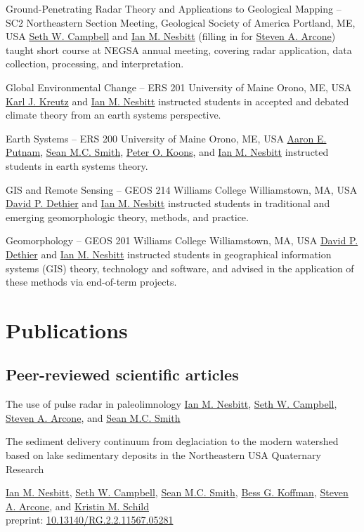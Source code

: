\documentclass[a4paper,12pt,sans,colorlinks]{moderncv}
\newcommand{\me}{\href{https://www.iannesbitt.org}{Ian M. Nesbitt}}
\newcommand{\seth}{\href{https://www.alpinesciences.net}{Seth W. Campbell}}
\newcommand{\sean}{\href{https://umaine.edu/earthclimate/people/sean-m-c-smith/}{Sean M.C. Smith}}
\newcommand{\bess}{\href{https://www.colby.edu/directory/profile/bess.koffman/}{Bess G. Koffman}}
\newcommand{\stevearcone}{\href{https://engineering.dartmouth.edu/community/faculty/steven-arcone}{Steven A. Arcone}}
\newcommand{\kristin}{\href{https://climatechange.umaine.edu/people/kristin-schild/}{Kristin M. Schild}}
\newcommand{\peter}{\href{https://umaine.edu/earthclimate/people/peter-koons/}{Peter O. Koons}}
\newcommand{\aaron}{\href{https://umaine.edu/earthclimate/people/aaron-putnam/}{Aaron E. Putnam}}
\newcommand{\karl}{\href{https://umaine.edu/earthclimate/people/karl-kreutz/}{Karl J. Kreutz}}
\newcommand{\david}{\href{https://geosciences.williams.edu/profile/ddethier/}{David P. Dethier}}
\newcommand{\doi}[1]{%
    \href{https://doi.org/#1}{#1}
}
\begin{document}
{Ground-Penetrating Radar Theory and Applications to Geological
Mapping -- SC2}
{Northeastern Section Meeting, Geological Society of America}
{Portland, ME, USA}
{}
{
    \seth{} and \me{} (filling in for \stevearcone{}) taught
    short course at NEGSA annual meeting, covering radar application,
    data collection, processing, and interpretation.
}

{Global Environmental Change -- ERS 201}
{University of Maine}
{Orono, ME, USA}
{}
{
    \karl{} and \me{} instructed students in accepted and
    debated climate theory from an earth systems perspective.
}

{Earth Systems -- ERS 200}
{University of Maine}
{Orono, ME, USA}
{}
{
    \aaron{}, \sean{}, \peter{}, and \me{} instructed students
    in earth systems theory.
}

{GIS and Remote Sensing -- GEOS 214}
{Williams College}
{Williamstown, MA, USA}
{}
{
    \david{} and \me{} instructed students in traditional and
    emerging geomorphologic theory, methods, and practice.
}

{Geomorphology -- GEOS 201}
{Williams College}
{Williamstown, MA, USA}
{}
{
    \david{} and \me{}
    instructed students in geographical information systems (GIS)
    theory, technology and software, and advised in the
    application of these methods via end-of-term projects.
}




\section{Publications}

\subsection{Peer-reviewed scientific articles}

{The use of pulse radar in paleolimnology}
{}
{}
{}
{
    \me{}, \seth{}, \stevearcone{}, and \sean{}
}

{The sediment delivery continuum from deglaciation to the modern
watershed based on lake sedimentary deposits in the Northeastern
USA}
{Quaternary Research}
{}
{}
{
    \me{}, \seth{}, \sean{}, \bess{}, \stevearcone{},
    and \kristin{}
    \\
    preprint: \doi{10.13140/RG.2.2.11567.05281}
}
\end{document}
